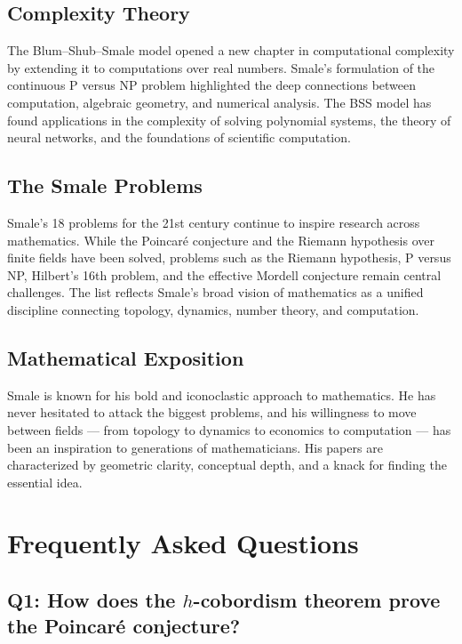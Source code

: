 \subsection{Complexity Theory}

The Blum--Shub--Smale model opened a new chapter in computational complexity by extending it to computations over real numbers. Smale's formulation of the continuous P versus NP problem highlighted the deep connections between computation, algebraic geometry, and numerical analysis. The BSS model has found applications in the complexity of solving polynomial systems, the theory of neural networks, and the foundations of scientific computation.

\subsection{The Smale Problems}

Smale's 18 problems for the 21st century continue to inspire research across mathematics. While the Poincar\'e conjecture and the Riemann hypothesis over finite fields have been solved, problems such as the Riemann hypothesis, P versus NP, Hilbert's 16th problem, and the effective Mordell conjecture remain central challenges. The list reflects Smale's broad vision of mathematics as a unified discipline connecting topology, dynamics, number theory, and computation.

\subsection{Mathematical Exposition}

Smale is known for his bold and iconoclastic approach to mathematics. He has never hesitated to attack the biggest problems, and his willingness to move between fields --- from topology to dynamics to economics to computation --- has been an inspiration to generations of mathematicians. His papers are characterized by geometric clarity, conceptual depth, and a knack for finding the essential idea.

\section{Frequently Asked Questions}

\subsection*{Q1: How does the \(h\)-cobordism theorem prove the Poincar\'e conjecture?}


